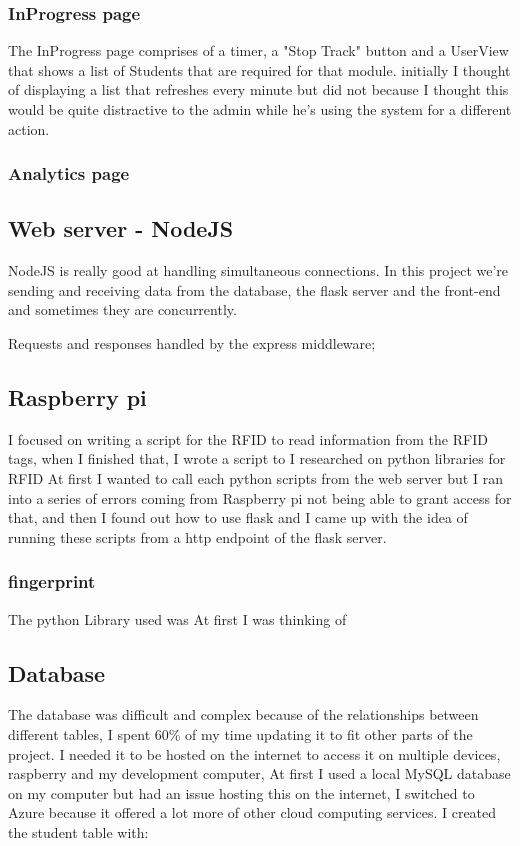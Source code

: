 \subsubsection{InProgress page}
The InProgress page comprises of a timer, a "Stop Track" button and a UserView that shows a list of Students that are required for that module. initially I thought of displaying a list that refreshes every minute but did not because I thought this would be quite distractive to the admin while he's using the system for a different action. 


\subsubsection{Analytics page}





\subsection{Web server - NodeJS}
NodeJS is really good at handling simultaneous connections. In this project we're sending and receiving data from the database, the flask server and the front-end and sometimes they are concurrently.

Requests and responses handled by the express middleware;

\subsection{Raspberry pi}
I focused on writing a script for the RFID to read information from the RFID tags, when I finished that, I wrote a script to 
I researched on python libraries for RFID
At first I wanted to call each python scripts from the web server but I ran into a series of errors coming from Raspberry pi not being able to grant access for that, and then I found out how to use flask and I came up with the idea of running these scripts from a http endpoint of the flask server.
\subsubsection{fingerprint}
The python Library used was 
At first I was thinking of 



\subsection{Database}
The database was difficult and complex because of the relationships between different tables, I spent 60\% of my time updating it to fit other parts of the project. I needed it to be hosted on the internet to access it on multiple devices, raspberry and my development computer, At first I used a local MySQL database on my computer but had an issue hosting this on the internet, I switched to Azure because it offered a lot more of other cloud computing services. I created the student table with:

